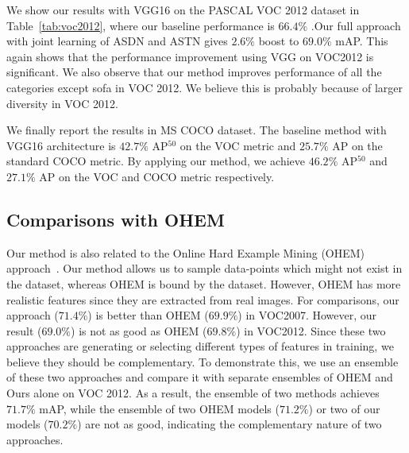 We show our results with VGG16 on the PASCAL VOC 2012 dataset in Table~\ref{tab:voc2012}, where our baseline performance is $66.4\%$ .Our full approach with joint learning of ASDN and ASTN gives $2.6\%$ boost to $69.0\%$ mAP. This again shows that the performance improvement using VGG on VOC2012 is significant. We also observe that our method improves performance of all the categories except sofa in VOC 2012. We believe this is probably because of larger diversity in VOC 2012.



We finally report the results in MS COCO dataset. The baseline method with VGG16 architecture is  $42.7\%$ AP$^{50}$ on the VOC metric and $25.7\%$ AP on the standard COCO metric. By applying our method, we achieve $46.2\%$ AP$^{50}$ and $27.1\%$ AP on the VOC and COCO metric respectively. 

\vspace{-0.05in}
\subsection{Comparisons with OHEM}
\vspace{-0.05in}
Our method is also related to the Online Hard Example Mining (OHEM) approach~\cite{shrivastavaOHEM}. Our method allows us to sample data-points which might not exist in the dataset, whereas OHEM is bound by the dataset. However, OHEM has more realistic features since they are extracted from real images. For comparisons, our approach ($71.4\%$) is better than OHEM ($69.9\%$) in VOC2007. However, our result ($69.0\%$) is not as good as OHEM ($69.8\%$) in VOC2012. Since these two approaches are generating or selecting different types of features in training,  we believe they should be complementary. To demonstrate this, we use an ensemble of these two approaches and compare it with separate ensembles of OHEM and Ours alone on VOC 2012. As a result, the ensemble of two methods achieves $71.7\%$ mAP, while the ensemble of two OHEM models ($71.2\%$) or two of our models ($70.2\%$) are not as good, indicating the complementary nature of two approaches. 









